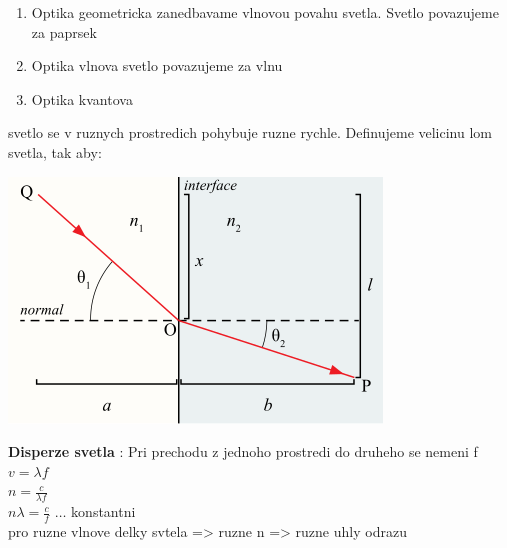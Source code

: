 \documentclass{report}
\begin{document}
\begin{enumerate}[label=\bfseries\tiny\protect\circled{\small\arabic*}]
  \item Optika geometricka zanedbavame vlnovou povahu svetla. Svetlo povazujeme za paprsek
  \item Optika vlnova svetlo povazujeme za vlnu
  \item Optika kvantova 
\end{enumerate}

svetlo se v ruznych prostredich pohybuje ruzne rychle. Definujeme velicinu lom svetla, tak aby: \\


\begin{center}
  \includegraphics[width=0.4\linewidth]{images/Snells_law.png}
\end{center}


\textbf{Disperze svetla} : Pri prechodu z jednoho prostredi do druheho se nemeni f \\
$v=\lambda f$ \\
$n = \frac{c}{\lambda f}$ \\
$n\lambda = \frac{c}{f}$ $\ldots$ konstantni \\
pro ruzne vlnove delky svtela => ruzne n => ruzne uhly odrazu \\
\end{document}

